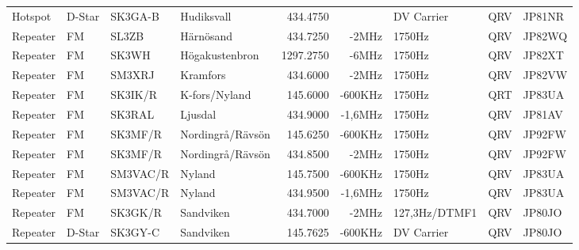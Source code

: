 \begin{landscape}
\begin{longtable}{llllrrlcl}
	Hotspot                   & D-Star        & SK3GA-B       & Hudiksvall          & 434.4750          &                & DV Carrier       & QRV             & JP81NR           \\
	Repeater                  & FM            & SL3ZB         & Härnösand           & 434.7250          & -2MHz          & 1750Hz           & QRV             & JP82WQ           \\
	Repeater                  & FM            & SK3WH         & Högakustenbron      & 1297.2750         & -6MHz          & 1750Hz           & QRV             & JP82XT           \\
	Repeater                  & FM            & SM3XRJ        & Kramfors            & 434.6000          & -2MHz          & 1750Hz           & QRV             & JP82VW           \\
	Repeater                  & FM            & SK3IK/R       & K-fors/Nyland       & 145.6000          & -600KHz        & 1750Hz           & QRT             & JP83UA           \\
	Repeater                  & FM            & SK3RAL        & Ljusdal             & 434.9000          & -1,6MHz        & 1750Hz           & QRV             & JP81AV           \\
	Repeater                  & FM            & SK3MF/R       & Nordingrå/Rävsön    & 145.6250          & -600KHz        & 1750Hz           & QRV             & JP92FW           \\
	Repeater                  & FM            & SK3MF/R       & Nordingrå/Rävsön    & 434.8500          & -2MHz          & 1750Hz           & QRV             & JP92FW           \\
	Repeater                  & FM            & SM3VAC/R      & Nyland              & 145.7500          & -600KHz        & 1750Hz           & QRV             & JP83UA           \\
	Repeater                  & FM            & SM3VAC/R      & Nyland              & 434.9500          & -1,6MHz        & 1750Hz           & QRV             & JP83UA           \\
	Repeater                  & FM            & SK3GK/R       & Sandviken           & 434.7000          & -2MHz          & 127,3Hz/DTMF1    & QRV             & JP80JO           \\
	Repeater                  & D-Star        & SK3GY-C       & Sandviken           & 145.7625          & -600KHz        & DV Carrier       & QRV             & JP80JO           \\

\end{longtable}
\end{landscape}
